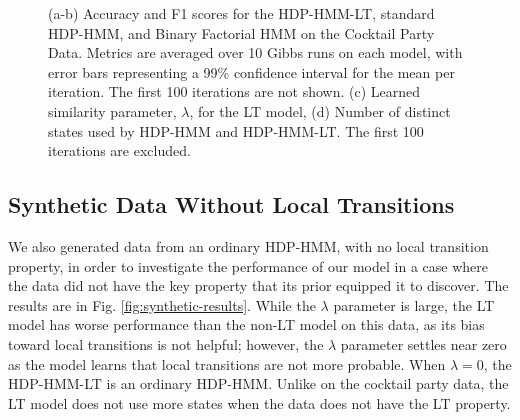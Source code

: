 \begin{figure}[tb]
\begin{minipage}{0.40\textwidth}
\end{minipage}
\caption{(a-b) Accuracy and F1 scores for the HDP-HMM-LT, standard HDP-HMM, and
    Binary Factorial HMM on
    the Cocktail Party Data.  Metrics are averaged
  over 10 Gibbs runs on each model, with error bars representing a 99\% confidence
  interval for the mean per iteration.  The first 100 iterations are
  not shown. (c) Learned similarity parameter, $\lambda$, for the LT
  model, (d) Number of distinct states used by HDP-HMM and
  HDP-HMM-LT.  The first 100 iterations are excluded.}
  \label{fig:cocktail-results}
\end{figure}

\subsection{Synthetic Data Without Local Transitions}
\label{sec:synth-data-without}

We also generated data from an ordinary HDP-HMM, with no local
transition property, in order to investigate the performance of our
model in a case where the data did not have the key property that its
prior equipped it to discover.  The results are in
Fig. \ref{fig:synthetic-results}.
While the $\lambda$ parameter is large, the LT model has worse
performance than the non-LT model on this data, as its bias toward
local transitions is not helpful; however, the
$\lambda$ parameter settles near zero as the model learns that local transitions are not more
probable.  When $\lambda = 0$, the HDP-HMM-LT is an ordinary HDP-HMM.
Unlike on the cocktail party data, the LT model does not use more
states when the data does not have the LT property.

